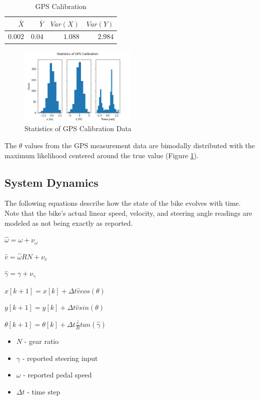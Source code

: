 \documentclass[twoside,twocolumn]{article}
\begin{document}
\begin{table}[h!]
\centering
\caption{GPS Calibration}
\label{table:alg1}
\begin{tabular}{rrrr}
\hline
$\bar{X}$ & $\bar{Y}$ & $Var(X)$ & $Var(Y)$\\ [0.5ex] 
\hline
$0.002$ & $0.04$ & $1.088$ & $2.984$\\
\hline
\end{tabular}
\end{table}

\begin{figure}[h]
\caption{Statistics of GPS Calibration Data}
\label{fig:hist}
\centering
\includegraphics[width=0.5\textwidth]{hist.png}
\end{figure}

The $\theta$ values from the GPS measurement data are bimodally distributed with the maximum likelihood centered around the true value (Figure \ref{fig:hist}).

\subsection{System Dynamics}
The following equations describe how the state of the bike evolves with time. Note that the bike's actual linear speed, velocity, and steering angle readings are modeled as not being exactly as reported.

\begin{center}
$\hat{\omega} = \omega + \nu_\omega$

$\hat{v} =  \hat{\omega} R N + \nu_v$

$\hat{\gamma} = \gamma + \nu_\gamma$

$x[k+1] = x[k] + \Delta t \hat{v}cos(\theta)$

$y[k+1] = y[k]  + \Delta t \hat{v} sin(\theta)$

$\theta[k+1] = \theta[k] + \Delta t \frac{\hat{v}}{B} tan(\hat{\gamma})$
\end{center}

\begin{itemize}
\item $N$ - gear ratio
\item $\gamma$ - reported steering input
\item $\omega$ - reported pedal speed
\item $\Delta t$ - time step
\end{itemize}
\end{document}
